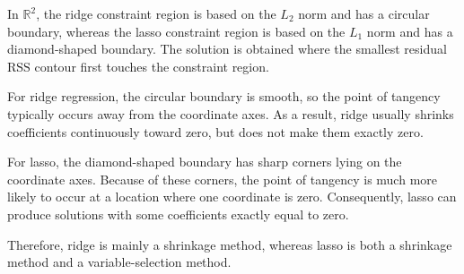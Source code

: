 \documentclass[
  letterpaper,
  DIV=11,
  numbers=noendperiod]{scrreprt}
\newcommand{\rss}{\mathrm{RSS}}
\theoremstyle{definition}
\theoremstyle{definition}
\theoremstyle{plain}
\theoremstyle{plain}
\theoremstyle{remark}
\begin{document}
In \(\mathbb{R}^2\), the ridge constraint region is based on the \(L_2\)
norm and has a circular boundary, whereas the lasso constraint region is
based on the \(L_1\) norm and has a diamond-shaped boundary. The
solution is obtained where the smallest residual \(\rss\) contour first
touches the constraint region.

For ridge regression, the circular boundary is smooth, so the point of
tangency typically occurs away from the coordinate axes. As a result,
ridge usually shrinks coefficients continuously toward zero, but does
not make them exactly zero.

For lasso, the diamond-shaped boundary has sharp corners lying on the
coordinate axes. Because of these corners, the point of tangency is much
more likely to occur at a location where one coordinate is zero.
Consequently, lasso can produce solutions with some coefficients exactly
equal to zero.

Therefore, ridge is mainly a shrinkage method, whereas lasso is both a
shrinkage method and a variable-selection method.
\end{document}
